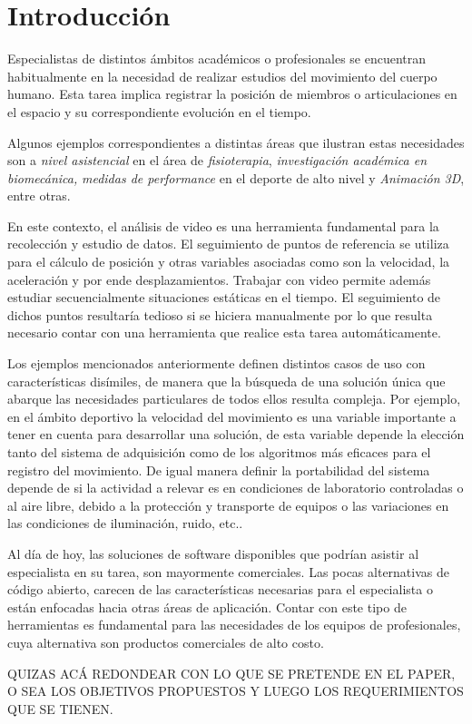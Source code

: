 \section{Introducción}
Especialistas de distintos ámbitos académicos o profesionales se encuentran habitualmente en la necesidad de realizar estudios del movimiento del cuerpo humano. Esta tarea implica registrar la posición de miembros o articulaciones en el espacio y su correspondiente evolución en el tiempo.
 

Algunos ejemplos correspondientes a distintas áreas que ilustran estas necesidades son a \emph{nivel asistencial} en el área de \emph{fisioterapia}, \emph{investigación académica en biomecánica,} \emph{medidas de performance} en el deporte de alto nivel y \emph{Animación 3D}, entre otras. 


En este contexto, el análisis de video  es  una  herramienta  fundamental para la recolección y estudio de datos. El seguimiento de puntos de referencia se utiliza para el cálculo de posición y otras variables asociadas como son la velocidad, la aceleración y por ende desplazamientos. Trabajar con video permite además estudiar secuencialmente situaciones estáticas en el tiempo. El seguimiento de dichos puntos resultaría tedioso si se hiciera manualmente por lo que resulta necesario contar con una herramienta que realice esta tarea automáticamente.


Los ejemplos mencionados anteriormente definen distintos casos de uso con características disímiles, de manera que la búsqueda de una solución única que abarque las necesidades particulares de todos ellos resulta compleja. Por ejemplo, en el ámbito deportivo la velocidad del movimiento es una variable importante a tener en cuenta para desarrollar una solución, de esta variable depende la elección tanto del sistema de adquisición como de los algoritmos más eficaces para el registro del movimiento.  De igual manera definir la portabilidad del sistema depende de si la actividad a relevar es en condiciones de laboratorio controladas o al aire libre, debido a la protección y transporte de equipos o las variaciones en las condiciones de iluminación, ruido, etc..



Al  día  de  hoy, las  soluciones  de  software  disponibles que  podrían  asistir al especialista en su tarea, son mayormente comerciales. Las pocas alternativas de código abierto, carecen de las características necesarias para el especialista o están enfocadas hacia otras áreas de aplicación. Contar con este tipo de herramientas es fundamental para las necesidades de los equipos de profesionales, cuya alternativa son productos comerciales de alto costo.



QUIZAS ACÁ REDONDEAR CON LO QUE SE PRETENDE EN EL PAPER, O SEA LOS OBJETIVOS PROPUESTOS Y LUEGO LOS REQUERIMIENTOS QUE SE TIENEN.
